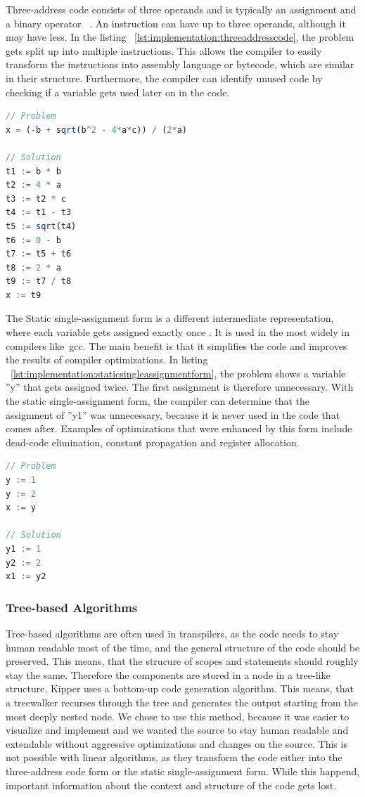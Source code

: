 Three-address code consists of three operands and is typically an assignment and a binary operator ~\cite{wiki:threeaddress}. An instruction can have up to three operands, although it may have less. In the listing ~\ref{lst:implementation:threeaddresscode}, the problem gets split up into multiple instructions. This allows the compiler to easily transform the instructions into assembly language or bytecode, which are similar in their structure. Furthermore, the compiler can identify unused code by checking if a variable gets used later on in the code.
\begin{lstlisting}[language=TypeScript,caption=Three-address code,label=lst:implementation:threeaddresscode]
// Problem
x = (-b + sqrt(b^2 - 4*a*c)) / (2*a)

// Solution
t1 := b * b
t2 := 4 * a
t3 := t2 * c
t4 := t1 - t3
t5 := sqrt(t4)
t6 := 0 - b
t7 := t5 + t6
t8 := 2 * a
t9 := t7 / t8
x := t9
\end{lstlisting}

The Static single-assignment form is a different intermediate representation, where each variable gets assigned exactly once \cite{wiki:singlestatic}. It is used in the most widely in compilers like~\acrshort{gcc}. The main benefit is that it simplifies the code and improves the results of compiler optimizations. In listing ~\ref{lst:implementation:staticsingleassignmentform}, the problem shows a variable ''y'' that gets assigned twice. The first assignment is therefore unnecessary. With the static single-assignment form, the compiler can determine that the assignment of ''y1'' was unnecessary, because it is never used in the code that comes after. Examples of optimizations that were enhanced by this form include dead-code elimination, constant propagation and register allocation.
\begin{lstlisting}[language=TypeScript,caption=Static single-assignment form,label=lst:implementation:staticsingleassignmentform]
// Problem
y := 1
y := 2
x := y

// Solution
y1 := 1
y2 := 2
x1 := y2
\end{lstlisting}

\subsubsection{Tree-based Algorithms}
Tree-based algorithms are often used in transpilers, as the code needs to stay human readable most of the time, and the general structure of the code should be preserved. This means, that the strucure of scopes and statements should roughly stay the same. Therefore the components are stored in a node in a tree-like structure. Kipper uses a bottom-up code generation algorithm. This means, that a treewalker recurses through the tree and generates the output starting from the most deeply nested node. We chose to use this method, because it was easier to visualize and implement and we wanted the source to stay human readable and extendable without aggressive optimizations and changes on the source. This is not possible with linear algorithms, as they transform the code either into the three-address code form or the static single-assignment form. While this happend, important information about the context and structure of the code gets lost.

